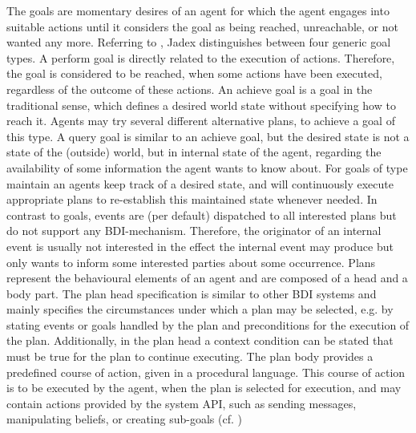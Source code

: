 The goals are momentary desires of an agent for which the agent engages into suitable actions until it considers the goal as being reached, unreachable, or not wanted any more.
Referring to \cite{ActiveComponentsGoals}, Jadex distinguishes between four generic goal types.
A perform goal is directly related to the execution of actions.
Therefore, the goal is considered to be reached, when some actions have been executed, regardless of the outcome of these actions.
An achieve goal is a goal in the traditional sense, which defines a desired world state without specifying how to reach it.
Agents may try several different alternative plans, to achieve a goal of this type.
A query goal is similar to an achieve goal, but the desired state is not a state of the (outside) world, but in internal state of the agent, regarding the availability of some information the agent wants to know about.
For goals of type maintain an agents keep track of a desired state, and will continuously execute appropriate plans to re-establish this maintained state whenever needed.
In contrast to goals, events are (per default) dispatched to all interested plans but do not support any BDI-mechanism.
Therefore, the originator of an internal event is usually not interested in the effect the internal event may produce but only wants to inform some interested parties about some occurrence.
Plans represent the behavioural elements of an agent and are composed of a head and a body part.
The plan head specification is similar to other BDI systems and mainly specifies the circumstances under which a plan may be selected, e.g. by stating events or goals handled by the plan and preconditions for the execution of the plan.
Additionally, in the plan head a context condition can be stated that must be true for the plan to continue executing.
The plan body provides a predefined course of action, given in a procedural language.
This course of action is to be executed by the agent, when the plan is selected for execution, and may contain actions provided by the system API, such as sending messages, manipulating beliefs, or creating sub-goals (cf. \cite{braubach_jadex_2004})

